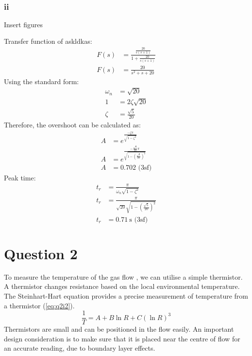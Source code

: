 \documentclass[11pt]{article}
\numberwithin{equation}{section}
\begin{document}
\subsubsection{ii}
Insert figures

Transfer function of askldkas:
\begin{align}
    F(s) &= \frac{\frac{20}{s(s+1)}}{1 + \frac{20}{s(s+1)}}\\
    F(s) &= \frac{20}{s^2 + s + 20 }
\end{align}
Using the standard form:
\begin{align}
    \omega_n &= \sqrt{20}\\
    1&= 2\zeta \sqrt{20}\\
    \zeta &= \frac{\sqrt{5}}{20}
\end{align}
Therefore, the overshoot can be calculated as:
\begin{align}
    A &= e^{\frac{-\zeta \pi}{\sqrt{1-\zeta^2}}}\\
    A &= e^{\frac{-\frac{\sqrt{5}}{20} \pi}{\sqrt{1-\left(\frac{\sqrt{5}}{20}\right)^2}}}\\
    A &= 0.702 \textrm{ (3sf)}
\end{align}
Peak time:
\begin{align}
    t_r &= \frac{\pi}{\omega_n \sqrt{1- \zeta^2}}\\
    t_r &= \frac{\pi}{\sqrt{20} \sqrt{1- \left(\frac{\sqrt{5}}{20}\right)^2}}\\
    t_r &= \SI{0.71}{\second} \textrm{ (3sf)}
\end{align}
\section{Question 2}
To measure the temperature of the gas flow , we can utilise a simple thermistor. A thermistor changes resistance based on the local environmental temperature. The Steinhart-Hart equation provides a precise measurement of temperature from a thermistor (\ref{eq:q2i2}). 
\begin{equation}
    \frac{1}{T} = A + B \ln R + C \left(\ln R\right)^3 \label{eq:q2i2}
\end{equation}
Thermistors are small and can be positioned in the flow easily. An important design consideration is to make sure that it is placed near the centre of flow for an accurate reading, due to boundary layer effects. 
\end{document}
